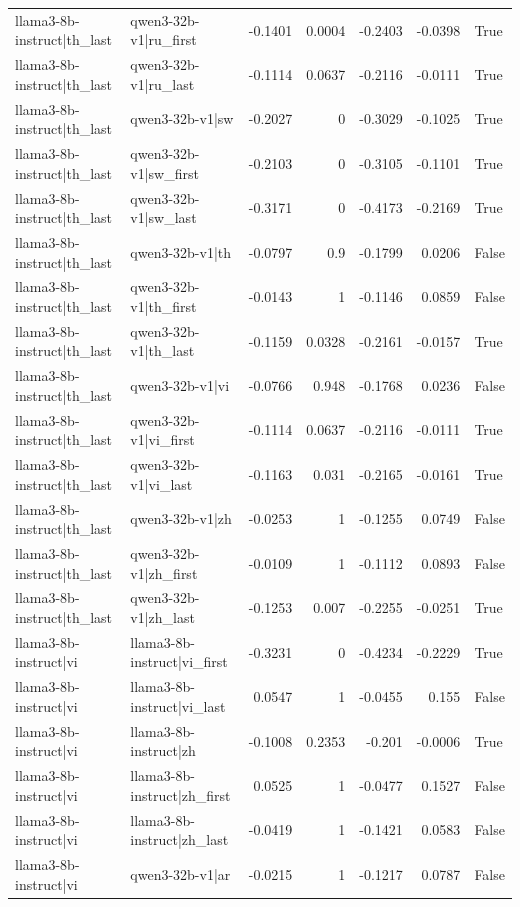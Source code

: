 \begin{table}
\begin{tabular}{l l r r r r l}
llama3-8b-instruct|th_last & qwen3-32b-v1|ru_first & -0.1401 & 0.0004 & -0.2403 & -0.0398 & True \\
llama3-8b-instruct|th_last & qwen3-32b-v1|ru_last & -0.1114 & 0.0637 & -0.2116 & -0.0111 & True \\
llama3-8b-instruct|th_last & qwen3-32b-v1|sw & -0.2027 & 0 & -0.3029 & -0.1025 & True \\
llama3-8b-instruct|th_last & qwen3-32b-v1|sw_first & -0.2103 & 0 & -0.3105 & -0.1101 & True \\
llama3-8b-instruct|th_last & qwen3-32b-v1|sw_last & -0.3171 & 0 & -0.4173 & -0.2169 & True \\
llama3-8b-instruct|th_last & qwen3-32b-v1|th & -0.0797 & 0.9 & -0.1799 & 0.0206 & False \\
llama3-8b-instruct|th_last & qwen3-32b-v1|th_first & -0.0143 & 1 & -0.1146 & 0.0859 & False \\
llama3-8b-instruct|th_last & qwen3-32b-v1|th_last & -0.1159 & 0.0328 & -0.2161 & -0.0157 & True \\
llama3-8b-instruct|th_last & qwen3-32b-v1|vi & -0.0766 & 0.948 & -0.1768 & 0.0236 & False \\
llama3-8b-instruct|th_last & qwen3-32b-v1|vi_first & -0.1114 & 0.0637 & -0.2116 & -0.0111 & True \\
llama3-8b-instruct|th_last & qwen3-32b-v1|vi_last & -0.1163 & 0.031 & -0.2165 & -0.0161 & True \\
llama3-8b-instruct|th_last & qwen3-32b-v1|zh & -0.0253 & 1 & -0.1255 & 0.0749 & False \\
llama3-8b-instruct|th_last & qwen3-32b-v1|zh_first & -0.0109 & 1 & -0.1112 & 0.0893 & False \\
llama3-8b-instruct|th_last & qwen3-32b-v1|zh_last & -0.1253 & 0.007 & -0.2255 & -0.0251 & True \\
llama3-8b-instruct|vi & llama3-8b-instruct|vi_first & -0.3231 & 0 & -0.4234 & -0.2229 & True \\
llama3-8b-instruct|vi & llama3-8b-instruct|vi_last & 0.0547 & 1 & -0.0455 & 0.155 & False \\
llama3-8b-instruct|vi & llama3-8b-instruct|zh & -0.1008 & 0.2353 & -0.201 & -0.0006 & True \\
llama3-8b-instruct|vi & llama3-8b-instruct|zh_first & 0.0525 & 1 & -0.0477 & 0.1527 & False \\
llama3-8b-instruct|vi & llama3-8b-instruct|zh_last & -0.0419 & 1 & -0.1421 & 0.0583 & False \\
llama3-8b-instruct|vi & qwen3-32b-v1|ar & -0.0215 & 1 & -0.1217 & 0.0787 & False \\

\end{tabular}
\end{table}
